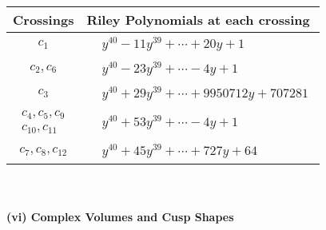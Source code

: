 \documentclass[1p]{elsarticle_modified}
\theoremstyle{definition}
\begin{document}
\begin{tabular}{m{50pt}|m{274pt}}
Crossings & \hspace{64pt}Riley Polynomials at each crossing \\
\hline $$\begin{aligned}c_{1}\end{aligned}$$&$\begin{aligned}
&y^{40}-11 y^{39}+\cdots+20 y+1
\end{aligned}$\\
\hline $$\begin{aligned}c_{2},c_{6}\end{aligned}$$&$\begin{aligned}
&y^{40}-23 y^{39}+\cdots-4 y+1
\end{aligned}$\\
\hline $$\begin{aligned}c_{3}\end{aligned}$$&$\begin{aligned}
&y^{40}+29 y^{39}+\cdots+9950712 y+707281
\end{aligned}$\\
\hline $$\begin{aligned}c_{4},c_{5},c_{9}\\c_{10},c_{11}\end{aligned}$$&$\begin{aligned}
&y^{40}+53 y^{39}+\cdots-4 y+1
\end{aligned}$\\
\hline $$\begin{aligned}c_{7},c_{8},c_{12}\end{aligned}$$&$\begin{aligned}
&y^{40}+45 y^{39}+\cdots+727 y+64
\end{aligned}$\\
\hline
\end{tabular}\\~\\
\newpage\flushleft \textbf{(vi) Complex Volumes and Cusp Shapes}
\end{document}
